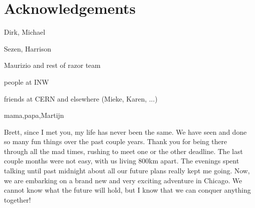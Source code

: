 \chapter*{Acknowledgements \label{sec:acknowledgements}}




Dirk, Michael

Sezen, Harrison

Maurizio and rest of razor team

people at INW

friends at CERN and elsewhere (Mieke, Karen, ...)

mama,papa,Martijn

Brett, since I met you, my life has never been the same. We have seen and done so many fun things
over the past couple years. 
Thank you for being there through all the mad times, rushing to meet one or the other deadline. 
The last couple months were not easy, with us living 800km apart. The evenings spent talking
until past midnight about all our future plans really kept me going. 
Now, we are embarking on a brand new and very exciting adventure in Chicago. 
We cannot know what the future will hold, but I know that we can conquer anything together!


